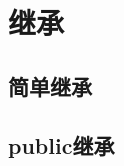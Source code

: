 \documentclass{../main.tex}{subfiles}
\begin{document}
\section{继承}
\subsection{简单继承}
% 

\subsection{public继承}
% 



\end{document}
